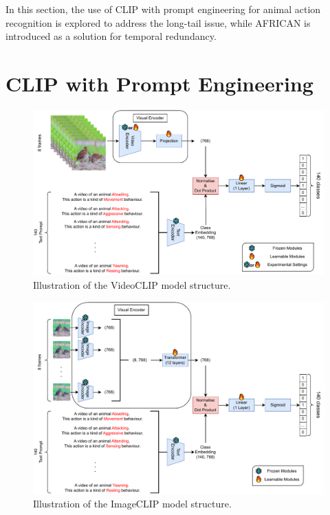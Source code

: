 In this section, the use of CLIP with prompt engineering for animal action recognition is explored to address the long-tail issue, while AFRICAN is introduced as a solution for temporal redundancy. 

\section{CLIP with Prompt Engineering}

\begin{figure}[ht]
    \centering
    \includegraphics[width=1.0\textwidth]{assets/charts/3_1_ModelStructureVC}
    \caption[VideoCLIP model structure]{Illustration of the VideoCLIP model structure.}
    \label{fig:modelstructure_vc}
\end{figure}

\begin{figure}[ht]
    \centering
    \includegraphics[width=1.0\textwidth]{assets/charts/3_2_ModelStructureIC}
    \caption[ImageCLIP Model Structure]{Illustration of the ImageCLIP model structure.}
    \label{fig:modelstructure_ic}
\end{figure}

